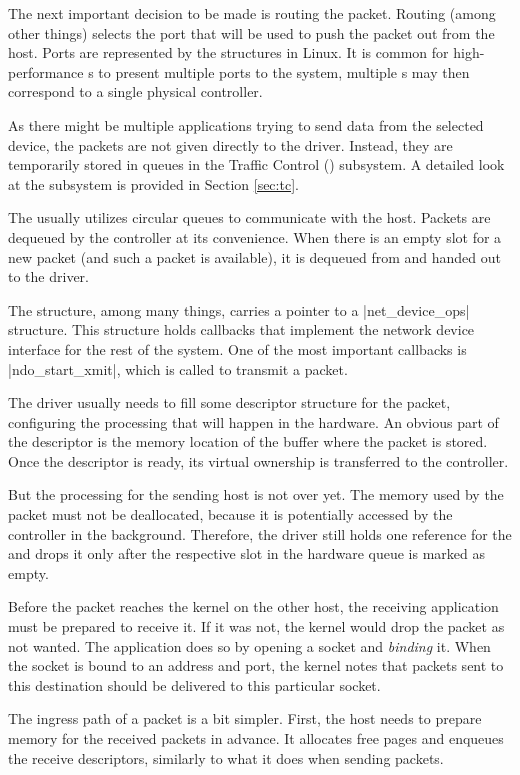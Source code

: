 The next important decision to be made is routing the packet. Routing (among
other things) selects the port that will be used to push the packet out from
the host. Ports are represented by the \netdev{} structures in Linux. It is common
for high-performance s to present multiple ports to the system,
multiple \netdev s may then correspond to a single physical controller.

As there might be multiple applications trying to send data from the
selected device, the packets are not given directly to the driver. Instead,
they are temporarily stored in queues in the Traffic Control () subsystem. A detailed
look at the subsystem is provided in Section \ref{sec:tc}.

The  usually utilizes circular queues to communicate with the host.
Packets are dequeued by the controller at its convenience. When there is an
empty slot for a new packet (and such a packet is available), it is dequeued
from  and handed out to the driver.

The \netdev{} structure, among many things, carries a pointer to
a \struct|net_device_ops| structure. This structure holds callbacks that
implement the network device interface for the rest of the system. One of the
most important callbacks is \fnc|ndo_start_xmit|, which is called to transmit a packet.

The driver usually needs to fill some descriptor structure for the packet,
configuring the processing that will happen in the hardware. An obvious part
of the descriptor is the memory location of the buffer where the packet is
stored. Once the descriptor is ready, its virtual ownership is transferred to
the controller.

But the processing for the sending host is not over yet. The memory used by
the packet must not be deallocated, because it is potentially accessed by the
controller in the background. Therefore, the driver still holds one reference
for the \skb{} and drops it only after the respective slot in the hardware
queue is marked as empty.

Before the packet reaches the kernel on the other host, the receiving application must be
prepared to receive it. If it was not, the kernel would drop the packet as
not wanted. The application does so by opening a socket and \emph{binding} it.
When the socket is bound to an address and port, the kernel notes that packets
sent to this destination should be delivered to this particular socket.

The ingress path of a packet is a bit simpler. First, the host needs to prepare
memory for the received packets in advance. It allocates free pages and
enqueues the receive descriptors, similarly to what it does when sending
packets.

